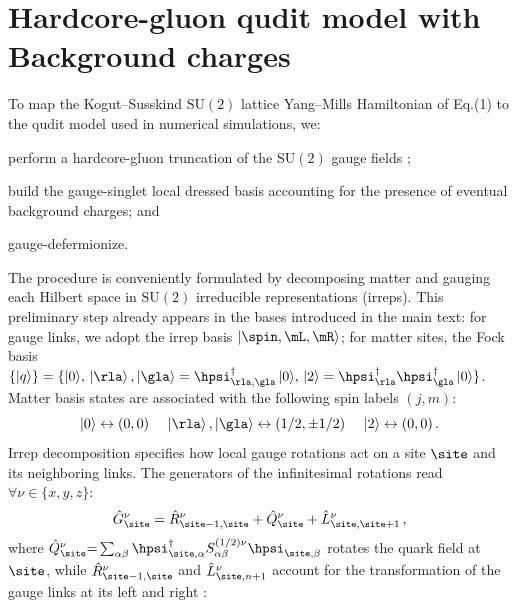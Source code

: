 \documentclass[aps,prl,reprint,twocolumn,superscriptaddress,floatfix,nofootinbib]{revtex4-2}
\begin{document}
\section{Hardcore-gluon qudit model with Background charges}
To map the Kogut--Susskind $\mathrm{SU}(2)$ lattice Yang--Mills Hamiltonian of Eq.(1) to the qudit model used in numerical simulations, we:
\begin{enumerate*}
    \item perform a hardcore-gluon truncation of the $\mathrm{SU}(2)$ gauge fields \cite{Cataldi2024Simulating2+1DSU2};
    \item build the gauge-singlet local dressed basis accounting for the presence of eventual background charges; and
    \item gauge-defermionize.
\end{enumerate*}
The procedure is conveniently formulated by decomposing matter and gauging each Hilbert space in $\mathrm{SU}(2)$ irreducible representations (irreps).
This preliminary step already appears in the bases introduced in the main text: for gauge links, we adopt the irrep basis $\ket{\spin, \mL, \mR}$; for matter sites, the Fock basis
\begin{math}
    \{\ket{q}\}
    =
    \{
    {\ket{0}},\,
    {\ket{\rla},\ket{\gla} = \hpsi^{\dagger}_{\rla,\gla}\ket{0}},\,
    {\ket{2}    = \hpsi^{\dagger}_{\rla} \hpsi^{\dagger}_{\gla}\ket{0}}
    \}
\end{math}.
Matter basis states are associated with the following spin labels $(j,m)$:
\begin{equation}
    \ket{0}               \leftrightarrow (0,0)
    \,\quad
    \ket{\rla},\ket{\gla} \leftrightarrow (1/2,\pm1/2)
    \,\quad
    \ket{2}               \leftrightarrow (0,0)
    \,.
\end{equation}
Irrep decomposition specifies how local gauge rotations act on a site $\site$ and its neighboring links.
The generators of the infinitesimal rotations read $\forall \nu\in \{x,y,z\}$:
\begin{equation}
    \hat{G}^{\nu}_{\site}=\hat{R}_{\site-1,\site}^{\nu} + \hat{Q}_{\site}^{\nu}+\hat{L}_{\site,\site+1}^{\nu}\,,
\end{equation}
where
\begin{math}
    \hat{Q}^{\nu}_{\site}{=}
    \sum_{\alpha\beta}
    \hpsi^{\dagger}_{\site,\alpha}
    S^{(1/2)\nu}_{\alpha\beta}
    \hpsi_{\site,\beta}
\end{math}
rotates the quark field at $\site$, while $\hat{R}_{\site-1,\site}^{\nu}$ and $\hat{L}^{\nu}_{\site,n+1}$ account for the transformation of the gauge links at its left and right \cite{Zohar2015QuantumSimulationsLattice}:
\end{document}
